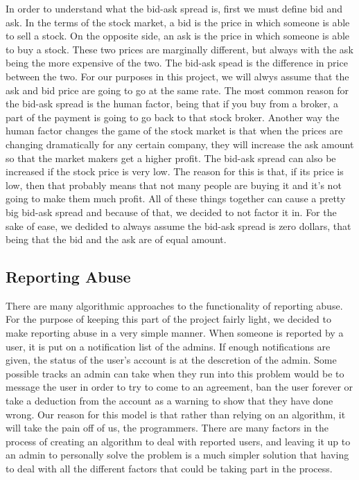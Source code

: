 In order to understand what the bid-ask spread is, first we must define bid and ask. In the terms of the stock market, a bid is the price in which someone is able to sell a stock. On the opposite side, an ask is the price in which someone is able to buy a stock. These two prices are marginally different, but always with the ask being the more expensive of the two.\cite{inv:bidask} The bid-ask spead is the difference in price between the two. For our purposes in this project, we will alwys assume that the ask and bid price are going to go at the same rate. The most common reason for the bid-ask spread is the human factor, being that if you buy from a broker, a part of the payment is going to go back to that stock broker.\cite{inv:spreaddet} Another way the human factor changes the game of the stock market is that when the prices are changing dramatically for any certain company, they will increase the ask amount so that the market makers get a higher profit. The bid-ask spread can also be increased if the stock price is very low. The reason for this is that, if its price is low, then that probably means that not many people are buying it and it's not going to make them much profit. All of these things together can cause a pretty big bid-ask spread and because of that, we decided to not factor it in. For the sake of ease, we dedided to always assume the bid-ask spread is zero dollars, that being that the bid and the ask are of equal amount. 

\subsection{Reporting Abuse}

There are many algorithmic approaches to the functionality of reporting abuse. For the purpose of keeping this part of the project fairly light, we decided to make reporting abuse in a very simple manner. When someone is reported by a user, it is put on a notification list of the admins. If enough notifications are given, the status of the user's account is at the descretion of the admin. Some possible tracks an admin can take when they run into this problem would be to message the user in order to try to come to an agreement, ban the user forever or take a deduction from the account as a warning to show that they have done wrong. Our reason for this model is that rather than relying on an algorithm, it will take the pain off of us, the programmers. There are many factors in the process of creating an algorithm to deal with reported users, and leaving it up to an admin to personally solve the problem is a much simpler solution that having to deal with all the different factors that could be taking part in the process.

